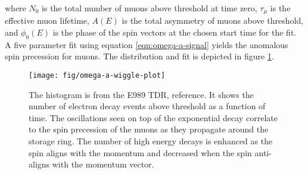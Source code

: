 where $N_0$ is the total number of muons above threshold at time zero, $\tau_\mu$ is the effective muon lifetime, $A(E)$ is the total asymmetry of muons above threshold, and $\phi_0(E)$ is the phase of the spin vectors at the chosen start time for the fit.  A five parameter fit using equation \ref{eqn:omega-a-signal} yields the anomalous spin precession for muons.  The distribution and fit is depicted in figure \ref{fig:omega-a-wiggle-plot}.

\begin{figure}
\texttt{[image: fig/omega-a-wiggle-plot]}
\caption{The histogram is from the E989 TDR, reference\cite{e989-tdr}.  It shows the number of electron decay events above threshold as a function of time.  The oscillations seen on top of the exponential decay correlate to the spin precession of the muons as they propagate around the storage ring.  The number of high energy decays is enhanced as the spin aligns with the momentum and decreased when the spin anti-aligns with the momentum vector. \label{fig:omega-a-wiggle-plot}}
\end{figure}
